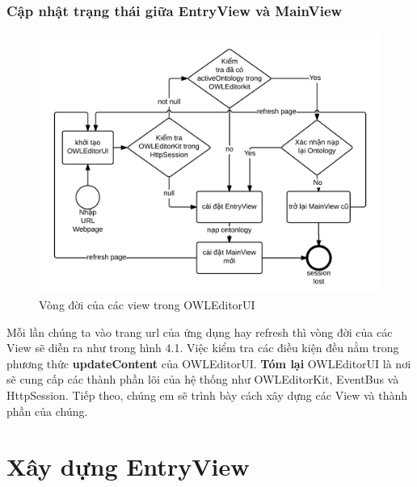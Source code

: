 \subsubsection{Cập nhật trạng thái giữa EntryView và MainView}
\begin{figure}[h!]
	\centering
	\includegraphics[width=150mm]{Figures/owleditorui_flowchart.png}
	\caption{Vòng đời của các view trong OWLEditorUI \label{overflow}}
\end{figure}
Mỗi lần chúng ta vào trang url của ứng dụng hay refresh thì vòng đời của các View sẽ diễn ra như trong hình 4.1. Việc kiểm tra các điều kiện đều nằm trong phương thức \textbf{updateContent} của OWLEditorUI.
\textbf{Tóm lại} OWLEditorUI là nơi sẽ cung cấp các thành phần lõi của hệ thống như OWLEditorKit, EventBus và HttpSession. Tiếp theo, chúng em sẽ trình bày cách xây dựng các View và thành phần của chúng.
\section{Xây dựng EntryView}
